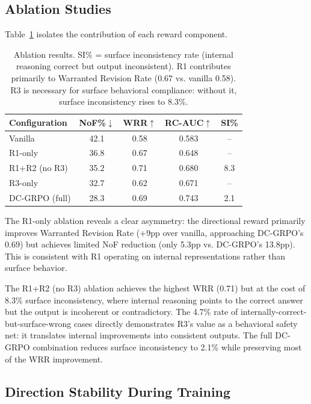 \documentclass[11pt,a4paper]{article}
\begin{document}
\subsection{Ablation Studies}

Table~\ref{tab:ablation} isolates the contribution of each reward component.

\begin{table}[t]
\centering
\small
\begin{tabular}{lcccc}
\toprule
\textbf{Configuration} & \textbf{NoF\%}$\downarrow$ & \textbf{WRR}$\uparrow$ & \textbf{RC-AUC}$\uparrow$ & \textbf{SI\%} \\
\midrule
Vanilla         & 42.1 & 0.58 & 0.583 & -- \\
R1-only         & 36.8 & 0.67 & 0.648 & -- \\
R1+R2 (no R3)   & 35.2 & 0.71 & 0.680 & 8.3 \\
R3-only         & 32.7 & 0.62 & 0.671 & -- \\
DC-GRPO (full)  & 28.3 & 0.69 & 0.743 & 2.1 \\
\bottomrule
\end{tabular}
\caption{Ablation results. SI\% = surface inconsistency rate (internal reasoning correct but output inconsistent). R1 contributes primarily to Warranted Revision Rate (0.67 vs. vanilla 0.58). R3 is necessary for surface behavioral compliance: without it, surface inconsistency rises to 8.3\%.}
\label{tab:ablation}
\end{table}

The R1-only ablation reveals a clear asymmetry: the directional reward primarily improves Warranted Revision Rate (+9pp over vanilla, approaching DC-GRPO's 0.69) but achieves limited NoF reduction (only 5.3pp vs. DC-GRPO's 13.8pp). This is consistent with R1 operating on internal representations rather than surface behavior.

The R1+R2 (no R3) ablation achieves the highest WRR (0.71) but at the cost of 8.3\% surface inconsistency, where internal reasoning points to the correct answer but the output is incoherent or contradictory. The 4.7\% rate of internally-correct-but-surface-wrong cases directly demonstrates R3's value as a behavioral safety net: it translates internal improvements into consistent outputs. The full DC-GRPO combination reduces surface inconsistency to 2.1\% while preserving most of the WRR improvement.

\subsection{Direction Stability During Training}
\end{document}
